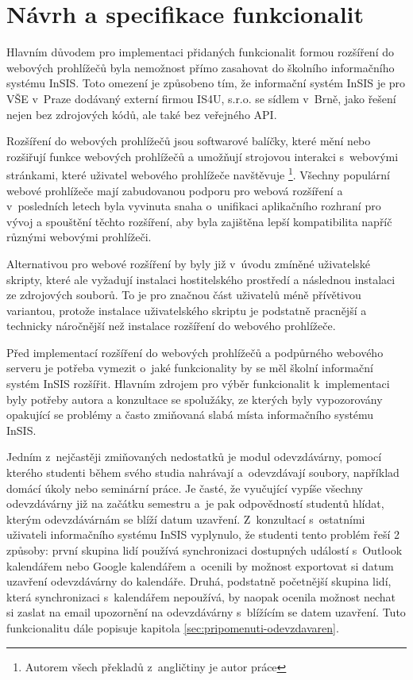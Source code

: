\chapter{Návrh a specifikace funkcionalit}\label{chap:navrh-a-specifikace}

Hlavním důvodem pro implementaci přidaných funkcionalit formou rozšíření do webových prohlížečů byla nemožnost přímo zasahovat do školního informačního systému InSIS. Toto omezení je způsobeno tím, že informační systém InSIS je pro VŠE v~Praze dodávaný externí firmou IS4U, s.r.o. se sídlem v~Brně, jako řešení nejen bez zdrojových kódů, ale také bez veřejného API. 

Rozšíření do webových prohlížečů jsou softwarové balíčky, které mění nebo rozšiřují funkce webových prohlížečů a umožňují strojovou interakci s~webovými stránkami, které uživatel webového prohlížeče navštěvuje \cite{web_extensions_2019}\footnote{Autorem všech překladů z~angličtiny je autor práce}. Všechny populární webové prohlížeče mají zabudovanou podporu pro webová rozšíření a v~posledních letech byla vyvinuta snaha o~unifikaci aplikačního rozhraní pro vývoj a spouštění těchto rozšíření, aby byla zajištěna lepší kompatibilita napříč různými webovými prohlížeči.  

Alternativou pro webové rozšíření by byly již v~úvodu zmíněné uživatelské skripty, které ale vyžadují instalaci hostitelského prostředí a následnou instalaci ze zdrojových souborů. To je pro značnou část uživatelů méně přívětivou variantou, protože instalace uživatelského skriptu je podstatně pracnější a technicky náročnější než instalace rozšíření do webového prohlížeče. 

Před implementací rozšíření do webových prohlížečů a podpůrného webového serveru je potřeba vymezit o~jaké funkcionality by se měl školní informační systém InSIS rozšířit. 
Hlavním zdrojem pro výběr funkcionalit k~implementaci byly potřeby autora a konzultace se spolužáky, ze kterých byly vypozorovány opakující se problémy a často zmiňovaná slabá místa informačního systému InSIS. 

Jedním z~nejčastěji zmiňovaných nedostatků je modul odevzdávárny, pomocí kterého studenti během svého studia nahrávají a~odevzdávají soubory, například domácí úkoly nebo seminární práce. Je časté, že vyučující vypíše všechny odevzdávárny již na začátku semestru a~je pak odpovědností studentů hlídat, kterým odevzdávárnám se blíží datum uzavření. Z~konzultací s~ostatními uživateli informačního systému InSIS vyplynulo, že studenti tento problém řeší 2 způsoby: první skupina lidí používá synchronizaci dostupných událostí s~Outlook kalendářem nebo Google kalendářem a~ocenili by možnost exportovat si datum uzavření odevzdávárny do kalendáře. Druhá, podstatně početnější skupina lidí, která synchronizaci s~kalendářem nepoužívá, by naopak ocenila možnost nechat si zaslat na email upozornění na odevzdávárny s~blížícím se datem uzavření. Tuto funkcionalitu dále popisuje kapitola \ref{sec:pripomenuti-odevzdavaren}.

